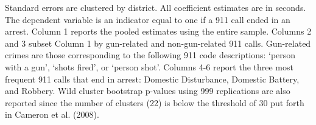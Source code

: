 \begin{table}[H]
\begin{threeparttable}
\begin{tablenotes}
\item Standard errors are clustered by district. All                      coefficient estimates are in seconds.                      The dependent variable is an indicator equal to one if a 911 call ended in an arrest.                      Column 1 reports the pooled estimates using the entire sample.                  Columns 2 and 3 subset Column 1 by gun-related and non-gun-related 911 calls.                  Gun-related crimes are those corresponding to the following                  911 code descriptions: `person with a gun',                  `shots fired', or `person shot'.                   Columns 4-6 report the three most frequent 911 calls that end in arrest: Domestic Disturbance,                  Domestic Battery, and Robbery. Wild cluster bootstrap p-values using 999 replications are also reported                  since the number of clusters (22) is below the threshold of 30 put forth in                  Cameron et al. (2008).                  
\end{tablenotes}
\end{threeparttable}
\end{table}
